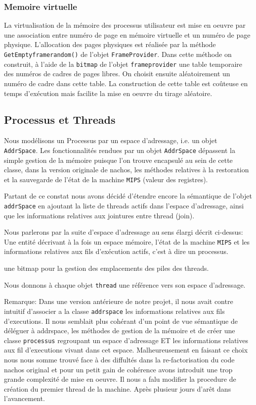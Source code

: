 \documentclass[11pt]{article}
\begin{document}
\subsubsection{}

\subsubsection{Memoire virtuelle}
La virtualisation de la mémoire des processus utilisateur est mise en oeuvre par une association entre numéro
de page en mémoire virtuelle et un numéro de page physique. L'allocation des pages physiques est réalisée par la méthode \texttt{GetEmptyframerandom()} de l'objet \texttt{FrameProvider}.
Dans cette méthode on construit, à l'aide de la \texttt{bitmap} de l'objet \texttt{frameprovider} une table temporaire des numéros de cadres de pages libres.
On choisit ensuite aléatoirement un numéro de cadre dans cette table. La construction de cette table est coûteuse
en temps d'exécution mais facilite la mise en oeuvre du tirage aléatoire.

\subsection{Processus et Threads}
Nous modélisons un Processus par un espace d'adressage, i.e. un objet \texttt{AddrSpace}.
Les fonctionnalités rendues par un objet \texttt{AddrSpace} dépassent la simple gestion de la mémoire puisque l'on trouve encapsulé au sein de cette classe, dans la version originale de nachos, les méthodes relatives à la restoration et la sauvegarde de l'état de la machine \texttt{MIPS} (valeur des registres).

Partant de ce constat nous avons décidé d'étendre encore la sémantique de l'objet \texttt{addrSpace} en ajoutant la liste de threads actifs dans l'espace d'adressage, ainsi que les informations relatives aux jointures entre thread (join).

Nous parlerons par la suite d'espace d'adressage au sens élargi décrit ci-dessus:
Une entité décrivant à la fois un espace mémoire, l'état de la machine \texttt{MIPS} et
les informations relatives aux fils d'exécution actifs, c'est à dire un processus.

une bitmap pour la gestion des emplacements des piles des threads.

Nous donnons à chaque objet \texttt{thread} une référence vers son espace d'adressage.

Remarque: Dans une version antérieure de notre projet, il nous avait contre intuitif d'associer a la classe
\texttt{addrspace} les informations relatives aux fils d'executions. Il nous semblait plus
cohérant d'un point de vue sémantique de déléguer à addrspace, les méthodes de gestion de la mémoire
et de créer une classe \texttt{processus} regroupant un espace d'adressage ET les informations relatives aux fil d'executions vivant dans cet espace. Malheureusement en faisant ce choix nous nous somme trouvé face à des diffultés dans la re-factorisation du code nachos original et pour un petit gain de cohérence avons introduit une trop grande complexité de mise en oeuvre. Il nous a falu modifier la procedure de création du premier thread de la machine. Après plusieur jours d'arêt dans l'avancement.
\end{document}

